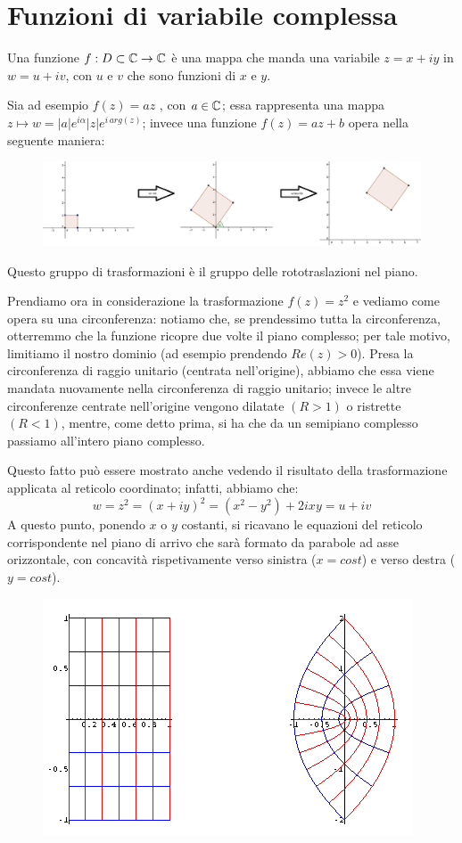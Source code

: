 \chapter{Funzioni di variabile complessa}

Una funzione $f:D\subset \mathbb{C} \to \mathbb{C}$ è una mappa che manda una variabile $z=x+iy$ in  $w=u+iv$, con $u$ e $v$ che sono funzioni di $x$ e $y$.

Sia ad esempio $f(z)=az$ , con $a \in \mathbb{C}$; essa rappresenta una mappa $z \mapsto w= |a|e^{i\alpha} |z|e^{i \, arg(z)}$; invece una funzione $f(z)=az+b$ opera nella seguente maniera:

\begin{figure}[h!]
    \includegraphics[width=1\textwidth]{immagini/trasformazione.jpg}
\end{figure}
Questo gruppo di trasformazioni è il gruppo delle rototraslazioni nel piano.

Prendiamo ora in considerazione la trasformazione $f(z)=z^2$ e vediamo come opera su una circonferenza:  notiamo che, se prendessimo tutta la circonferenza, otterremmo che la funzione ricopre due volte il piano complesso; per tale motivo, limitiamo il nostro dominio (ad esempio prendendo $Re(z)>0$). Presa la circonferenza di raggio unitario (centrata nell'origine), abbiamo che essa viene mandata nuovamente nella circonferenza di raggio unitario; invece le altre circonferenze centrate nell'origine vengono dilatate $(R>1)$ o ristrette $(R<1)$, mentre, come detto prima, si ha che da un semipiano complesso passiamo all'intero piano complesso.

Questo fatto può essere mostrato anche vedendo il risultato della trasformazione applicata al reticolo coordinato; infatti, abbiamo che:
$$w=z^2=(x+iy)^2=(x^2 -y^2)+2ixy=u+iv$$
A questo punto, ponendo $x$ o $y$ costanti, si ricavano le equazioni del reticolo corrispondente nel piano di arrivo che sarà formato da parabole ad asse orizzontale, con concavità rispetivamente verso sinistra ($x=cost$) e verso destra ($y=cost$).

\begin{figure}[h!]
  \centering
    \includegraphics[width=0.4 \textwidth]{immagini/quadrato.png}
\end{figure}

